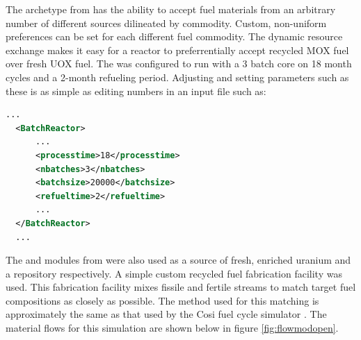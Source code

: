 The  archetype from \Cycamore has the ability to accept
fuel materials from an arbitrary number of different sources dilineated by
commodity. Custom, non-uniform preferences can be set for each different fuel
commodity.  The dynamic resource exchange makes it easy for a reactor to
preferrentially accept recycled MOX fuel over fresh UOX fuel.  The
 was configured to run with a 3 batch core on 18 month cycles and
a 2-month refueling period.  Adjusting and setting parameters such as these is
as simple as editing numbers in an input file such as:

\begin{lstlisting}[language=xml]
  ...
  <BatchReactor>
      ...
      <processtime>18</processtime>
      <nbatches>3</nbatches>
      <batchsize>20000</batchsize>
      <refueltime>2</refueltime>
      ...
  </BatchReactor>
  ...
\end{lstlisting}

The  and  modules from \Cycamore were also used as a
source of fresh, enriched uranium and a repository respectively. A simple
custom recycled fuel fabrication facility was used.  This fabrication facility
mixes fissile and fertile streams to match target fuel compositions as closely
as possible.  The method used for this matching is approximately the same as
that used by the Cosi fuel cycle simulator . The material flows for this simulation are shown below in figure
\ref{fig:flowmodopen}.


